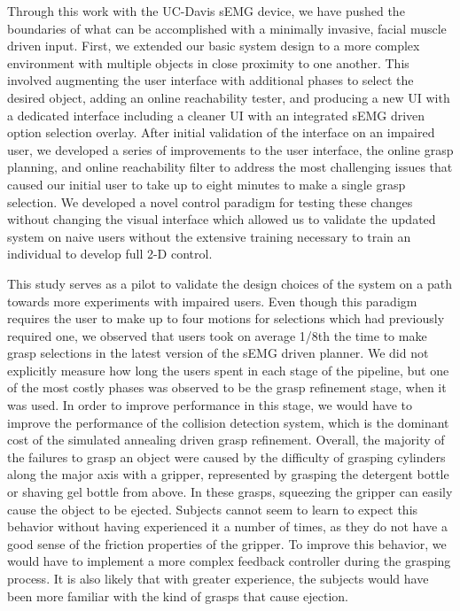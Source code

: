 Through this work with the UC-Davis sEMG device, we have pushed the boundaries of what can be accomplished with a minimally invasive, facial muscle driven input. First, we extended our basic system design to a more complex environment with multiple objects in close proximity to one another. This involved augmenting the user interface with additional phases to select the desired object, adding an online reachability tester, and producing a new UI with a dedicated interface including a cleaner UI with an integrated sEMG driven option selection overlay. After initial validation of the interface on an impaired user, we developed a series of improvements to the user interface, the online grasp planning, and online reachability filter to address the most challenging issues that caused our initial user to take up to eight minutes to make a single grasp selection. We developed a novel control paradigm for testing these changes without changing the visual interface which allowed us to validate the updated system on naive users without the extensive training necessary to train an individual to develop full 2-D control. 

This study serves as a pilot to validate the design choices of the system on a path towards more experiments with impaired users. Even though this paradigm requires the user to make up to four motions for selections which had previously required one, we observed that users took on average 1/8th the time to make grasp selections in the latest version of the sEMG driven planner. We did not explicitly measure how long the users spent in each stage of the pipeline, but one of the most costly phases was observed to be the grasp refinement stage, when it was used. In order to improve performance in this stage, we would have to improve the performance of the collision detection system, which is the dominant cost of the simulated annealing driven grasp refinement. Overall, the majority of the failures to grasp an object were caused by the difficulty of grasping cylinders along the major axis with a gripper, represented by grasping the detergent bottle or shaving gel bottle from above. In these grasps, squeezing the gripper can easily cause the object to be ejected. Subjects cannot seem to learn to expect this behavior without having experienced it a number of times, as they do not have a good sense of the friction properties of the gripper. To improve this behavior, we would have to implement a more complex feedback controller during the grasping process. It is also likely that with greater experience, the subjects would have been more familiar with the kind of grasps that cause ejection. 

